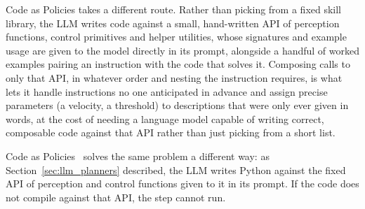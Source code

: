 
Code as Policies \cite{liang2023codeaspolicies} takes a different route. Rather than picking
from a fixed skill library, the LLM writes code against a small, hand-written API of perception
functions, control primitives and helper utilities, whose signatures and example usage are given
to the model directly in its prompt, alongside a handful of worked examples pairing an instruction
with the code that solves it. Composing calls to only that API, in whatever order and nesting the
instruction requires, is what lets it handle instructions no one anticipated in advance and assign
precise parameters (a velocity, a threshold) to descriptions that were only ever given in words,
at the cost of needing a language model capable of writing correct, composable code against that
API rather than just picking from a short list.



Code as Policies~\cite{liang2023codeaspolicies} solves the same problem a different way: as
Section~\ref{sec:llm_planners} described, the LLM writes Python against the fixed API of
perception and control functions given to it in its prompt. If the code does not compile against
that API, the step cannot run.




